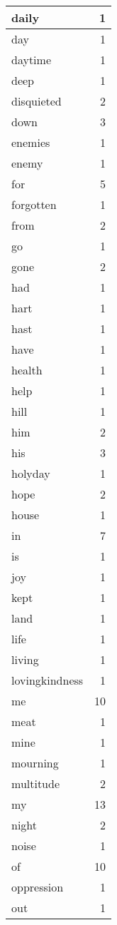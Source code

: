 \begin{center}
\begin{longtable}{l|r}
daily & 1 \\ \hline
day & 1 \\ \hline
daytime & 1 \\ \hline
deep & 1 \\ \hline
disquieted & 2 \\ \hline
down & 3 \\ \hline
enemies & 1 \\ \hline
enemy & 1 \\ \hline
for & 5 \\ \hline
forgotten & 1 \\ \hline
from & 2 \\ \hline
go & 1 \\ \hline
gone & 2 \\ \hline
had & 1 \\ \hline
hart & 1 \\ \hline
hast & 1 \\ \hline
have & 1 \\ \hline
health & 1 \\ \hline
help & 1 \\ \hline
hill & 1 \\ \hline
him & 2 \\ \hline
his & 3 \\ \hline
holyday & 1 \\ \hline
hope & 2 \\ \hline
house & 1 \\ \hline
in & 7 \\ \hline
is & 1 \\ \hline
joy & 1 \\ \hline
kept & 1 \\ \hline
land & 1 \\ \hline
life & 1 \\ \hline
living & 1 \\ \hline
lovingkindness & 1 \\ \hline
me & 10 \\ \hline
meat & 1 \\ \hline
mine & 1 \\ \hline
mourning & 1 \\ \hline
multitude & 2 \\ \hline
my & 13 \\ \hline
night & 2 \\ \hline
noise & 1 \\ \hline
of & 10 \\ \hline
oppression & 1 \\ \hline
out & 1 \\ \hline

\end{longtable}
\end{center}
